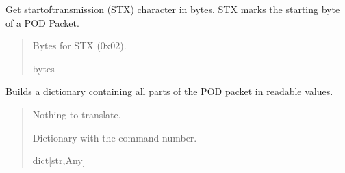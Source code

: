 \documentclass[letterpaper,10pt,english]{sphinxmanual}
\begin{document}
\begin{fulllineitems}
\begin{fulllineitems}
\end{fulllineitems}


\begin{fulllineitems}
\label{\detokenize{PodApi.Packets:PodApi.Packets.Packet.Packet.STX}}
\pysigstartsignatures
{}
\pysigstopsignatures
\sphinxAtStartPar
Get start\sphinxhyphen{}of\sphinxhyphen{}transmission (STX) character in bytes. STX marks the starting byte of a POD Packet.
\begin{quote}\begin{description}
\sphinxAtStartPar
Bytes for STX (0x02).

\sphinxAtStartPar
bytes

\end{description}\end{quote}

\end{fulllineitems}


\begin{fulllineitems}
\label{\detokenize{PodApi.Packets:PodApi.Packets.Packet.Packet.TranslateAll}}
\pysigstartsignatures
{}
\pysigstopsignatures
\sphinxAtStartPar
Builds a dictionary containing all parts of the POD packet in readable values.
\begin{quote}\begin{description}
\sphinxAtStartPar
{} \textendash{} Nothing to translate.

\sphinxAtStartPar
Dictionary with the command number.

\sphinxAtStartPar
dict{[}str,Any{]}

\end{description}\end{quote}

\end{fulllineitems}


\end{fulllineitems}
\end{document}
